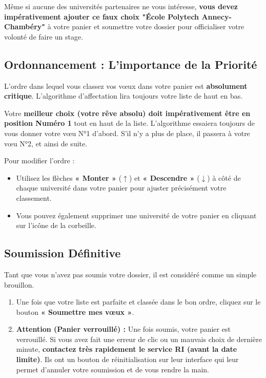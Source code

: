 \documentclass[12pt,a4paper]{article}
\begin{document}
\begin{tcolorbox}[colback=red!5!white,colframe=red!75!black,title=⚠️ OBLIGATION DE SOUMISSION]
Même si aucune des universités partenaires ne vous intéresse, \textbf{vous devez impérativement ajouter ce faux choix "École Polytech Annecy-Chambéry"} à votre panier et soumettre votre dossier pour officialiser votre volonté de faire un stage.
\end{tcolorbox}

\subsection{Ordonnancement : L'importance de la Priorité}
L'ordre dans lequel vous classez vos vœux dans votre panier est \textbf{absolument critique}. L'algorithme d'affectation lira toujours votre liste de haut en bas.

\begin{tcolorbox}[colback=red!5!white,colframe=red!75!black,title=⚠️ STRATÉGIE DE CLASSEMENT]
Votre \textbf{meilleur choix (votre rêve absolu) doit impérativement être en position Numéro 1} tout en haut de la liste.
\newline \newline L'algorithme essaiera toujours de vous donner votre vœu N°1 d'abord. S'il n'y a plus de place, il passera à votre vœu N°2, et ainsi de suite.
\end{tcolorbox}

Pour modifier l'ordre :
\begin{itemize}
    \item Utilisez les flèches \textbf{« Monter »} ($\uparrow$) et \textbf{« Descendre »} ($\downarrow$) à côté de chaque université dans votre panier pour ajuster précisément votre classement.
    \item Vous pouvez également supprimer une université de votre panier en cliquant sur l'icône de la corbeille.
\end{itemize}

\subsection{Soumission Définitive}
Tant que vous n'avez pas soumis votre dossier, il est considéré comme un simple brouillon.
\begin{enumerate}
    \item Une fois que votre liste est parfaite et classée dans le bon ordre, cliquez sur le bouton \textbf{« Soumettre mes vœux »}.
    \item \textbf{Attention (Panier verrouillé) :} Une fois soumis, votre panier est verrouillé. Si vous avez fait une erreur de clic ou un mauvais choix de dernière minute, \textbf{contactez très rapidement le service RI (avant la date limite)}. Ils ont un bouton de réinitialisation sur leur interface qui leur permet d'annuler votre soumission et de vous rendre la main.
\end{enumerate}
\end{document}
